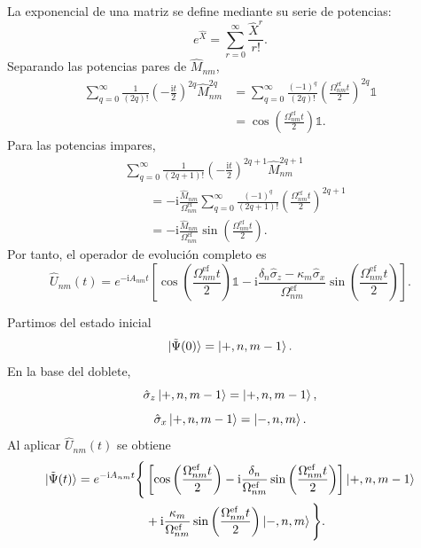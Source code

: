\documentclass[11pt]{article}
\newcommand{\ii}{\mathrm{i}}
\newcommand{\Id}{\mathds{1}}
\begin{document}
La exponencial de una matriz se define mediante su serie de potencias:
\begin{equation}
  e^{\hat X}
  =
  \sum_{r=0}^{\infty}
  \frac{\hat X^r}{r!}.
\end{equation}
Separando las potencias pares de $\hat M_{nm}$,
\begin{equation}
\begin{aligned}
  \sum_{q=0}^{\infty}
  \frac{1}{(2q)!}
  \left(-\frac{\ii t}{2}\right)^{2q}
  \hat M_{nm}^{2q}
  &=
  \sum_{q=0}^{\infty}
  \frac{(-1)^q}{(2q)!}
  \left(
  \frac{\Omega_{nm}^{\mathrm{ef}}t}{2}
  \right)^{2q}
  \Id
  \\
  &=
  \cos\left(
  \frac{\Omega_{nm}^{\mathrm{ef}}t}{2}
  \right)
  \Id.
\end{aligned}
\end{equation}
Para las potencias impares,
\begin{equation}
\begin{aligned}
  &\sum_{q=0}^{\infty}
  \frac{1}{(2q+1)!}
  \left(-\frac{\ii t}{2}\right)^{2q+1}
  \hat M_{nm}^{2q+1}
  \\
  &\qquad=
  -\ii
  \frac{\hat M_{nm}}{\Omega_{nm}^{\mathrm{ef}}}
  \sum_{q=0}^{\infty}
  \frac{(-1)^q}{(2q+1)!}
  \left(
  \frac{\Omega_{nm}^{\mathrm{ef}}t}{2}
  \right)^{2q+1}
  \\
  &\qquad=
  -\ii
  \frac{\hat M_{nm}}{\Omega_{nm}^{\mathrm{ef}}}
  \sin\left(
  \frac{\Omega_{nm}^{\mathrm{ef}}t}{2}
  \right).
\end{aligned}
\end{equation}
Por tanto, el operador de evoluci\'on completo es
\begin{equation}
  \boxed{
  \hat U_{nm}(t)
  =
  e^{-\ii A_{nm}t}
  \left[
  \cos\left(
  \frac{\Omega_{nm}^{\mathrm{ef}}t}{2}
  \right)\Id
  -
  \ii
  \frac{
  \delta_n\hat\sigma_z-
  \kappa_m\hat\sigma_x
  }{\Omega_{nm}^{\mathrm{ef}}}
  \sin\left(
  \frac{\Omega_{nm}^{\mathrm{ef}}t}{2}
  \right)
  \right].
  }
\end{equation}

Partimos del estado inicial
\begin{equation}
  \ket{\tilde\Psi(0)}
  =
  \ket{+,n,m-1}.
\end{equation}
En la base del doblete,
\begin{equation}
  \hat\sigma_z\ket{+,n,m-1}
  =
  \ket{+,n,m-1},
\end{equation}
\begin{equation}
  \hat\sigma_x\ket{+,n,m-1}
  =
  \ket{-,n,m}.
\end{equation}
Al aplicar $\hat U_{nm}(t)$ se obtiene
\begin{equation}
\begin{aligned}
  \ket{\tilde\Psi(t)}
  =e^{-\ii A_{nm}t}\Bigg\{&
  \left[
  \cos\left(
  \frac{\Omega_{nm}^{\mathrm{ef}}t}{2}
  \right)
  -
  \ii
  \frac{\delta_n}{\Omega_{nm}^{\mathrm{ef}}}
  \sin\left(
  \frac{\Omega_{nm}^{\mathrm{ef}}t}{2}
  \right)
  \right]
  \ket{+,n,m-1}
  \\
  &+
  \ii
  \frac{\kappa_m}{\Omega_{nm}^{\mathrm{ef}}}
  \sin\left(
  \frac{\Omega_{nm}^{\mathrm{ef}}t}{2}
  \right)
  \ket{-,n,m}
  \Bigg\}.
\end{aligned}
\end{equation}
\end{document}
